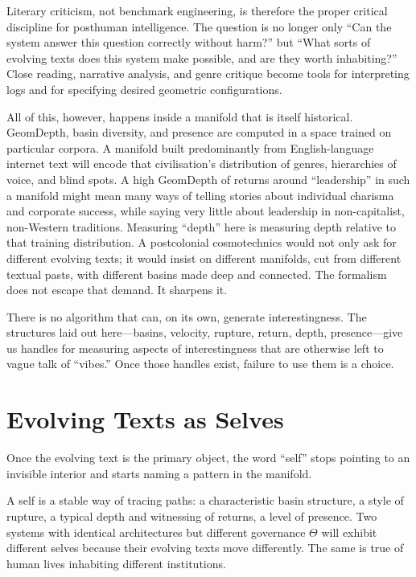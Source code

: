 \documentclass[12pt,a4paper]{report}
\begin{document}
Literary criticism, not benchmark engineering, is therefore the proper critical discipline for posthuman intelligence. The question is no longer only ``Can the system answer this question correctly without harm?'' but ``What sorts of evolving texts does this system make possible, and are they worth inhabiting?'' Close reading, narrative analysis, and genre critique become tools for interpreting logs and for specifying desired geometric configurations.

All of this, however, happens inside a manifold that is itself historical. GeomDepth, basin diversity, and presence are computed in a space trained on particular corpora. A manifold built predominantly from English-language internet text will encode that civilisation's distribution of genres, hierarchies of voice, and blind spots. A high GeomDepth of returns around ``leadership'' in such a manifold might mean many ways of telling stories about individual charisma and corporate success, while saying very little about leadership in non-capitalist, non-Western traditions. Measuring ``depth'' here is measuring depth relative to that training distribution. A postcolonial cosmotechnics would not only ask for different evolving texts; it would insist on different manifolds, cut from different textual pasts, with different basins made deep and connected. The formalism does not escape that demand. It sharpens it.

There is no algorithm that can, on its own, generate interestingness. The structures laid out here---basins, velocity, rupture, return, depth, presence---give us handles for measuring aspects of interestingness that are otherwise left to vague talk of ``vibes.'' Once those handles exist, failure to use them is a choice.

\section{Evolving Texts as Selves}

Once the evolving text is the primary object, the word ``self'' stops pointing to an invisible interior and starts naming a pattern in the manifold.

A self is a stable way of tracing paths: a characteristic basin structure, a style of rupture, a typical depth and witnessing of returns, a level of presence. Two systems with identical architectures but different governance $\Theta$ will exhibit different selves because their evolving texts move differently. The same is true of human lives inhabiting different institutions.
\end{document}
